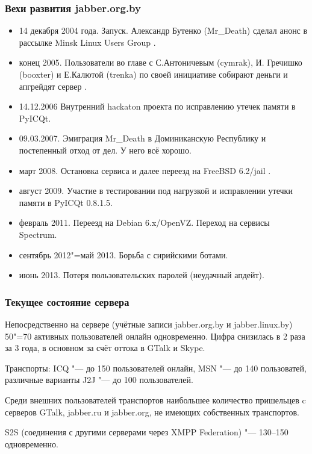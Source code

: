 \documentclass[10pt, a5paper]{article}
\begin{document}
\subsubsection*{Вехи развития jabber.org.by}

\begin{itemize}
  \item 14 декабря 2004 года. Запуск. Александр Бутенко (Mr\_Death) сделал анонс в рассылке Minsk Linux Users Group \cite{Mendoza5}.
  \item конец 2005. Пользователи во главе с С.Антоничевым (cymrak), И. Гречишко (booxter)  и Е.Калютой (trenka) по своей инициативе собирают деньги и апгрейдят сервер \cite{Mendoza6}.
  \item 14.12.2006 Внутренний hackaton проекта по исправлению утечек памяти в PyICQt.
  \item 09.03.2007. Эмиграция Mr\_Death в Доминиканскую Республику и постепенный отход от дел. У него всё хорошо.
  \item март 2008. Остановка сервиса и далее переезд на FreeBSD 6.2/jail \cite{Mendoza7}.
  \item август 2009. Участие в тестировании под нагрузкой и исправлении утечки памяти в PyICQt 0.8.1.5.
  \item февраль 2011. Переезд на Debian 6.x/OpenVZ. Переход на сервисы Spectrum.
  \item сентябрь 2012"=май 2013. Борьба с сирийскими ботами.
  \item июнь 2013. Потеря пользовательских паролей (неудачный апдейт).
\end{itemize}

\subsubsection*{Текущее состояние сервера}

Непосредственно на сервере (учётные записи jabber.org.by и \linebreak jabber.linux.by) 50"=70 активных пользователей онлайн одновременно. Цифра снизилась в 2 раза за 3 года, в основном за счёт оттока в GTalk и Skype.

Транспорты: ICQ "--- до 150 пользователей онлайн, MSN "--- до 140 пользоватей, различные варианты J2J "--- до 100 пользователей.

Среди внешних пользователей транспортов наибольшее количество пришельцев  c серверов GTalk, jabber.ru и jabber.org, не имеющих собственных транспортов.

S2S (соединения с другими серверами через XMPP Federation) "--- 130--150 одновременно.
\end{document}
